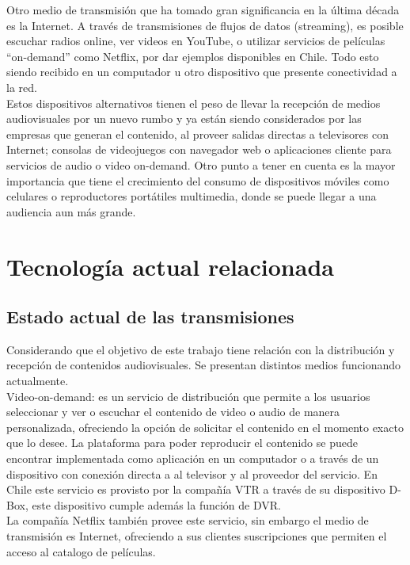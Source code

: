 Otro medio de transmisión que ha tomado gran significancia en la última década es la Internet. A través de transmisiones de flujos de datos (streaming), es posible escuchar radios online, ver videos en YouTube, o utilizar servicios de películas “on-demand” como Netflix, por dar ejemplos disponibles en Chile. Todo esto siendo recibido en un computador u otro dispositivo que presente conectividad a la red.\\

Estos dispositivos alternativos tienen el peso de llevar la recepción de medios audiovisuales por un nuevo rumbo y ya están siendo considerados por las empresas que generan el contenido, al proveer salidas directas a televisores con Internet; consolas de videojuegos con navegador web o aplicaciones cliente para servicios de audio o video on-demand. Otro punto a tener en cuenta es la mayor importancia que tiene el crecimiento del consumo de dispositivos móviles como celulares o reproductores portátiles multimedia, donde se puede llegar a una audiencia aun más grande.\\

\section{Tecnología actual relacionada}

\subsection{Estado actual de las transmisiones}

Considerando que el objetivo de este trabajo tiene relación con la distribución y recepción de contenidos audiovisuales. Se presentan distintos medios funcionando actualmente.\\

Video-on-demand: es un servicio de distribución que permite a los usuarios seleccionar y ver o escuchar el contenido de video o audio de manera personalizada, ofreciendo la opción de solicitar el contenido en el momento exacto que lo desee.  La plataforma para poder reproducir el contenido se puede encontrar implementada como aplicación en un computador o a través de un dispositivo con conexión directa a al televisor y al proveedor del servicio. En Chile este servicio es provisto por la compañía VTR a través de su dispositivo D-Box, este dispositivo cumple además la función de DVR.\\

La compañía Netflix también provee este servicio, sin embargo el medio de transmisión es Internet, ofreciendo a sus clientes suscripciones que permiten el acceso al catalogo de películas.\\

